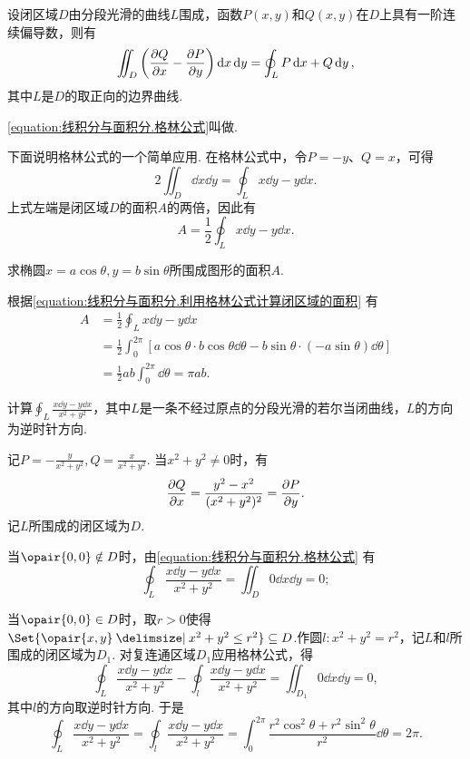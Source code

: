 \begin{theorem}[格林公式]
设闭区域\(D\)由分段光滑的曲线\(L\)围成，函数\(P(x,y)\)和\(Q(x,y)\)在\(D\)上具有一阶连续偏导数，则有
\begin{equation}\label{equation:线积分与面积分.格林公式}
\iint_D \left( \pdv{Q}{x} - \pdv{P}{y} \right) \dd{x}\dd{y}
= \oint_L P\dd{x} + Q\dd{y},
\end{equation}其中\(L\)是\(D\)的取正向的边界曲线.
\end{theorem}
\cref{equation:线积分与面积分.格林公式}叫做.

下面说明格林公式的一个简单应用.
在格林公式中，令\(P=-y\)、\(Q=x\)，可得\[
2 \iint_D \dd{x}\dd{y}
=\oint_L x\dd{y}-y\dd{x}.
\]上式左端是闭区域\(D\)的面积\(A\)的两倍，因此有
\begin{equation}\label{equation:线积分与面积分.利用格林公式计算闭区域的面积}
A = \frac{1}{2} \oint_L x\dd{y}-y\dd{x}.
\end{equation}
\begin{example}
求椭圆\(x = a \cos\theta, y = b \sin\theta\)所围成图形的面积\(A\).
\begin{solution}
根据\cref{equation:线积分与面积分.利用格林公式计算闭区域的面积} 有\begin{align*}
A &= \frac{1}{2} \oint_L x\dd{y}-y\dd{x} \\
&= \frac{1}{2} \int_0^{2\pi} \left[ a \cos\theta \cdot b \cos\theta \dd{\theta}
	- b \sin\theta \cdot (-a \sin\theta) \dd{\theta} \right] \\
&= \frac{1}{2} ab \int_0^{2\pi} \dd{\theta}
= \pi ab.
\end{align*}
\end{solution}
\end{example}

\begin{example}
计算\(\oint_L \frac{x\dd{y}-y\dd{x}}{x^2+y^2}\)，其中\(L\)是一条不经过原点的分段光滑的若尔当闭曲线，\(L\)的方向为逆时针方向.
\begin{solution}
记\(P = -\frac{y}{x^2+y^2}, Q = \frac{x}{x^2+y^2}\).
当\(x^2+y^2\neq0\)时，有\[
\pdv{Q}{x} = \frac{y^2-x^2}{(x^2+y^2)^2} = \pdv{P}{y}.
\]记\(L\)所围成的闭区域为\(D\).

当\(\opair{0,0} \notin D\)时，由\cref{equation:线积分与面积分.格林公式} 有\[
\oint_L \frac{x\dd{y}-y\dd{x}}{x^2+y^2} = \iint_D 0 \dd{x}\dd{y} = 0;
\]

当\(\opair{0,0} \in D\)时，取\(r>0\)使得\(\Set{ \opair{x,y} \given x^2+y^2 \leq r^2 } \subseteq D\).作圆\(l: x^2+y^2=r^2\)，记\(L\)和\(l\)所围成的闭区域为\(D_1\).
对复连通区域\(D_1\)应用格林公式，得\[
\oint_L \frac{x\dd{y}-y\dd{x}}{x^2+y^2} - \oint_l \frac{x\dd{y}-y\dd{x}}{x^2+y^2}
= \iint_{D_1} 0 \dd{x}\dd{y} = 0,
\]其中\(l\)的方向取逆时针方向.
于是\[
\oint_L \frac{x\dd{y}-y\dd{x}}{x^2+y^2}
= \oint_l \frac{x\dd{y}-y\dd{x}}{x^2+y^2}
= \int_0^{2\pi} \frac{r^2 \cos^2\theta + r^2 \sin^2\theta}{r^2} \dd{\theta}
= 2\pi.
\]
\end{solution}
\end{example}

